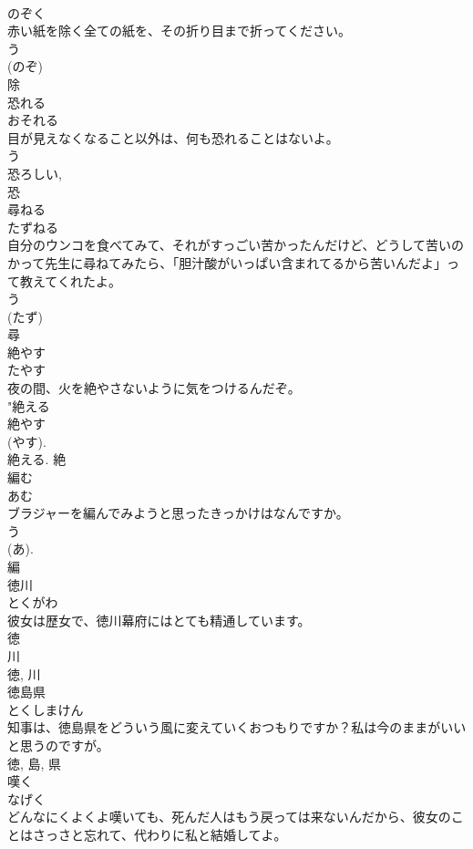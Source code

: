 \documentclass[8pt]{extreport}
\begin{document}
\begin{CJK}{UTF8}{min}
\\	のぞく	
\\	赤い紙を除く全ての紙を、その折り目まで折ってください。	
\\	う 
\\	(のぞ) 
\\	除	
\\	恐れる	
\\	おそれる	
\\	目が見えなくなること以外は、何も恐れることはないよ。	
\\	う 
\\	恐ろしい, 
\\	恐	
\\	尋ねる	
\\	たずねる	
\\	自分のウンコを食べてみて、それがすっごい苦かったんだけど、どうして苦いのかって先生に尋ねてみたら、「胆汁酸がいっぱい含まれてるから苦いんだよ」って教えてくれたよ。	
\\	う 
\\	(たず) 
\\	尋	
\\	絶やす	
\\	たやす	
\\	夜の間、火を絶やさないように気をつけるんだぞ。	
\\	"絶える 
\\	絶やす 
\\	(やす).
\\	絶える.	絶	
\\	編む	
\\	あむ	
\\	ブラジャーを編んでみようと思ったきっかけはなんですか。	
\\	う 
\\	(あ). 
\\	編	
\\	徳川	
\\	とくがわ	
\\	彼女は歴女で、徳川幕府にはとても精通しています。	
\\	徳 
\\	川 
\\	徳, 川	
\\	徳島県	
\\	とくしまけん	
\\	知事は、徳島県をどういう風に変えていくおつもりですか？私は今のままがいいと思うのですが。	
\\	徳, 島, 県	
\\	嘆く	
\\	なげく	
\\	どんなにくよくよ嘆いても、死んだ人はもう戻っては来ないんだから、彼女のことはさっさと忘れて、代わりに私と結婚してよ。	

\end{CJK}
\end{document}
